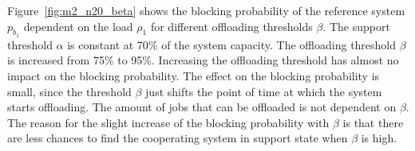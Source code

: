 
Figure~\ref{fig:m2_n20_beta} shows the blocking probability of the reference system $p_{b_1}$ dependent on the load $\rho_1$ for different offloading thresholds $\beta$. The support threshold $\alpha$ is constant at 70\% of the system capacity. The offloading threshold $\beta$ is increased from 75\% to 95\%. Increasing the offloading threshold has almost no impact on the blocking probability. The effect on the blocking probability is small, since the threshold $\beta$ just shifts the point of time at which the system starts offloading. The amount of jobs that can be offloaded is not dependent on $\beta$. The reason for the slight increase of the blocking probability with $\beta$ is that there are less chances to find the cooperating system in support state when $\beta$ is high.



